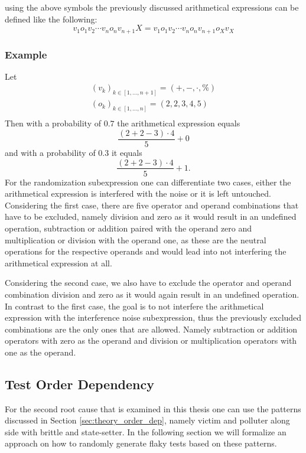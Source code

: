 \documentclass[
fancyheadings, %
%
%
]{stsreprt}
\begin{document}
using the above symbols the previously discussed arithmetical expressions can be defined like the following:
\[
    v_1 o_1 v_2 \cdots  v_n o_n v_{n+1} X = v_1 o_1 v_2 \cdots  v_n o_n v_{n+1} o_X v_X
\]
\subsubsection{Example}
Let 
\begin{gather*}
    (v_{k})_{k \in [1, ..., n+1]} = (+,-,\cdot, \%) \\
    (o_k)_{k \in [1, ..., n]} = (2,2,3,4,5) \\
\end{gather*}
Then with a probability of $0.7$ the arithmetical expression equals
\[
    \dfrac{(2 + 2 - 3) \cdot 4 }{5} + 0
\]
and with a probability of $0.3$ it equals 
\[
    \dfrac{(2 + 2 - 3) \cdot 4 }{5} + 1.
\]
For the randomization subexpression one can differentiate two cases, either the arithmetical expression is interfered with the noise or it is left untouched.
Considering the first case, there are five operator and operand combinations that have to be excluded, namely division and zero as it would result in an undefined operation, subtraction or addition paired with the operand zero and multiplication or division with the operand one, as these are the neutral operations for the respective operands and would lead into not interfering the arithmetical expression at all. \par 
Considering the second case, we also have to exclude the operator and operand combination division and zero as it would again result in an undefined operation. 
In contrast to the first case, the goal is to not interfere the arithmetical expression with the interference noise subexpression, thus the previously excluded combinations are the only ones that are allowed. 
Namely subtraction or addition operators with zero as the operand and division or multiplication operators with one as the operand. 

\subsection{Test Order Dependency}
For the second root cause that is examined in this thesis one can use the patterns discussed in Section \ref{sec:theory_order_dep}, namely victim and polluter along side with brittle and state-setter.
In the following section we will formalize an approach on how to randomly generate flaky tests based on these patterns. \par
\end{document}
